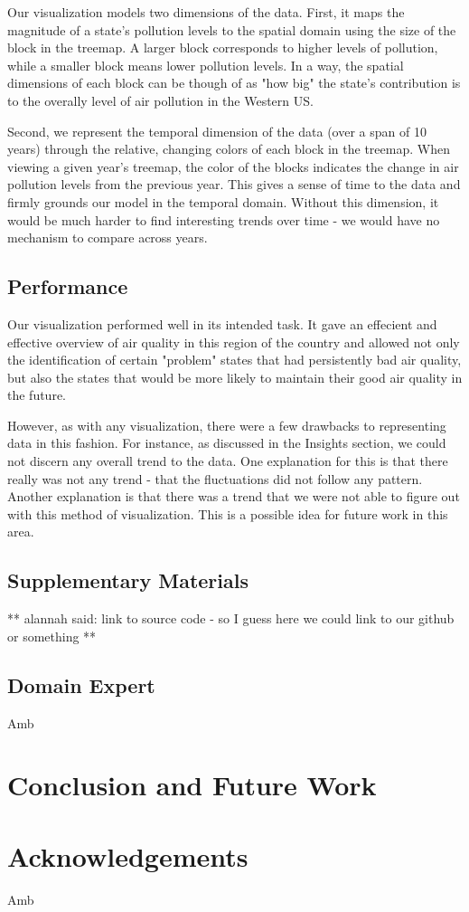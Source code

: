 \documentclass[journal]{vgtc}                %
\begin{document}
Our visualization models two dimensions of the data. First, it maps the magnitude of a state's pollution levels to 
the spatial domain using the size of the block in the treemap. A larger block corresponds to higher levels of pollution, 
while a smaller block means lower pollution levels. In a way, the spatial dimensions of each block can be though of as 
"how big" the state's contribution is to the overally level of air pollution in the Western US.

Second, we represent the temporal dimension of the data (over a span of 10 years) through the relative, changing colors of each block
in the treemap. When viewing a given year's treemap, the color of the blocks indicates the change in air pollution levels 
from the previous year. This gives a sense of time to the data and firmly grounds our model in the temporal domain. Without
this dimension, it would be much harder to find interesting trends over time - we would have no mechanism to compare 
across years.

\subsection{Performance}

Our visualization performed well in its intended task. It gave an effecient and effective overview of air quality in this 
region of the country and allowed not only the identification of certain "problem" states that had persistently bad
air quality, but also the states that would be more likely to maintain their good air quality in the future.

However, as with any visualization, there were a few drawbacks to representing data in this fashion. For instance, as discussed
in the Insights section, we could not discern any overall trend to the data. One explanation for this is that there really was
not any trend - that the fluctuations did not follow any pattern. Another explanation is that there was a trend that we were not
able to figure out with this method of visualization. This is a possible idea for future work in this area. 

\subsection{Supplementary Materials}
** alannah said: link to source code - so I guess here we could link to our github or something **

\subsection{Domain Expert}
Amb

\section{Conclusion and Future Work}



\section{Acknowledgements}

Amb
\end{document}
